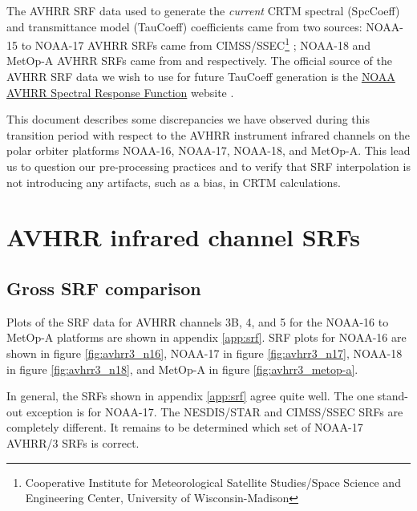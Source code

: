 The AVHRR SRF data used to generate the \textit{current} CRTM spectral (SpcCoeff) and transmittance model (TauCoeff) coefficients came from two sources: NOAA-15 to NOAA-17 AVHRR SRFs came from CIMSS/SSEC\footnote{Cooperative Institute for Meteorological Satellite Studies/Space Science and Engineering Center, University of Wisconsin-Madison} \citep{CIMSS_SRFs}; NOAA-18 and MetOp-A AVHRR SRFs came from \citet{Sullivan_avhrr3_n18_srf} and \citet{Sullivan_avhrr3_metop-a_srf} respectively. 
The official source of the AVHRR SRF data we wish to use for future TauCoeff generation is the  \href{http://www.star.nesdis.noaa.gov/smcd/spb/fwu/solar_cal/spec_resp_func}{NOAA AVHRR Spectral Response Function} website \citep{NESDIS_AVHRR_SRFs}.

This document describes some discrepancies we have observed during this transition period with respect to the AVHRR instrument infrared channels on the polar orbiter platforms NOAA-16, NOAA-17, NOAA-18, and MetOp-A. This lead us to question our pre-processing practices and to verify that SRF interpolation is not introducing any artifacts, such as a bias, in CRTM calculations.


\section{AVHRR infrared channel SRFs}

\subsection{Gross SRF comparison}
Plots of the SRF data for AVHRR channels 3B, 4, and 5 for the NOAA-16 to MetOp-A platforms are shown in appendix \ref{app:srf}. SRF plots for NOAA-16 are shown in figure \ref{fig:avhrr3_n16}, NOAA-17 in figure \ref{fig:avhrr3_n17}, NOAA-18 in figure \ref{fig:avhrr3_n18}, and MetOp-A in figure \ref{fig:avhrr3_metop-a}.

In general, the SRFs shown in appendix \ref{app:srf} agree quite well. The one stand-out exception is for NOAA-17. The NESDIS/STAR and CIMSS/SSEC SRFs are completely different. It remains to be determined which set of NOAA-17 AVHRR/3 SRFs is correct.


